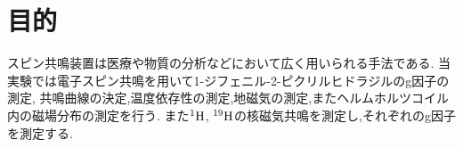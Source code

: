 \documentclass[uplatex,a4j,11pt,dvipdfmx]{jsarticle}
\begin{document}
\section{目的}
スピン共鳴装置は医療や物質の分析などにおいて広く用いられる手法である.
当実験では電子スピン共鳴を用いて1-ジフェニル-2-ピクリルヒドラジルのg因子の測定,
共鳴曲線の決定,温度依存性の測定,地磁気の測定,またヘルムホルツコイル内の磁場分布の測定を行う.
また$^{1}{\rm H}$, $^{19}{\rm H}$の核磁気共鳴を測定し,それぞれのg因子を測定する.




\newpage



\end{document}
